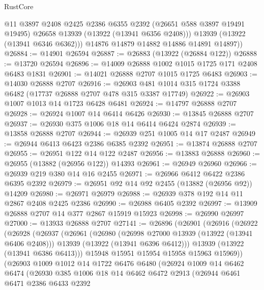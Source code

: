 \begin{lexlean}{RustCore}
\begin{coremodule}
            @11
            @3897
            @2408
            @2425
            @2386
            @6355
            @2392
            (@26651 @588 @3897 @19491 @19495)
            @26658
            @13939
            (@13922 (@13941 @6356 @2408)))
          @13939
          (@13922 (@13941 @6346 @6362)))
        @14876
        @14879
        @14882
        @14886
        @14891
        @14897))
@26884 := @14901 @26594
@26887 := @26883 (@13922 (@26884 @122))
@26888 := @13720 @26594
@26896 := @14009 @26888 @1002 @1015 @1725 @171 @2408 @6483 @1831
@26901 := @14021 @26888 @2707 @1015 @1725 @6483
@26903 := @14030 @26888 @2707
@26916 := @26903 @481 @1014 @315 @1724 @3388 @6482 (@17737 @26888 @2707 @478 @315 @3387 @17749)
@26922 := @26903 @1007 @1013 @14 @1723 @6428 @6481
@26924 := @14797 @26888 @2707
@26928 := @26924 @1007 @14 @6414 @6426
@26930 := @13845 @26888 @2707
@26937 := @26930 @375 @1006 @18 @14 @6414 @6424 @2874
@26939 := @13858 @26888 @2707
@26944 := @26939 @251 @1005 @14 @17 @2487
@26949 := @26944 @6413 @6423 @2386 @6385 @2392
@26951 := @13874 @26888 @2707
@26955 := @26951 @122 @14 @122 @2487
@26956 := @13883 @26888
@26960 := @26955 (@13882 (@26956 @122)) @14393
@26961 := @26949 @26960
@26966 := @26939 @219 @380 @14 @16 @2455
@26971 := @26966 @6412 @6422 @2386 @6395 @2392
@26979 := @26951 @92 @14 @92 @2455 (@13882 (@26956 @92)) @14209
@26980 := @26971 @26979
@26988 := @26939 @378 @192 @14 @11 @2867 @2408 @2425 @2386
@26990 := @26988 @6405 @2392
@26997 := @13909 @26888 @2707 @14 @377 @2867 @15919 @15923
@26998 := @26990 @26997
@27000 := @13933 @26888 @2707
@27141 := @26896
    (@26901
      (@26916
        (@26922
          (@26928
            (@26937
              (@26961
                (@26980
                  (@26998 @27000 @13939 (@13922 (@13941 @6406 @2408)))
                  @13939
                  (@13922 (@13941 @6396 @6412)))
                @13939
                (@13922 (@13941 @6386 @6413)))
              @15948
              @15951
              @15954
              @15958
              @15963
              @15969))
          (@26903
            @1009
            @1012
            @14
            @1722
            @6476
            @6480
            (@26924
              @1009
              @14
              @6462
              @6474
              (@26930
                @385
                @1006
                @18
                @14
                @6462
                @6472
                @2913
                (@26944
                  @6461
                  @6471
                  @2386
                  @6433
                  @2392

\end{coremodule}
\end{lexlean}
